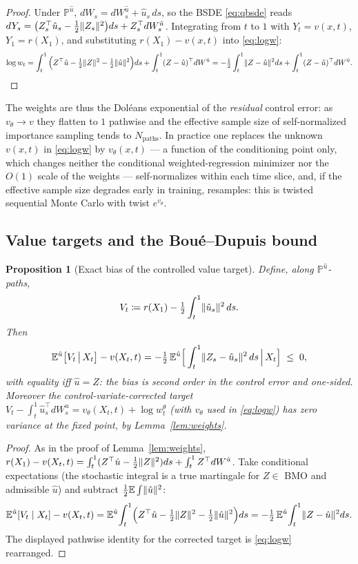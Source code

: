 \documentclass[11pt]{article}
\newtheorem{proposition}[theorem]{Proposition}
\theoremstyle{definition}
\theoremstyle{remark}
\newcommand{\E}{\mathbb{E}}
\newcommand{\Pmeas}{\mathbb{P}}
\newcommand{\uhat}{\hat{u}}
\DeclarePairedDelimiter{\norm}{\lVert}{\rVert}
\begin{document}
\begin{proof}
Under $\Pmeas^{\uhat}$, $dW_s = dW^{\uhat}_s + \uhat_s\,ds$, so the BSDE \eqref{eq:qbsde}
reads $dY_s = \big(Z_s^\top \uhat_s - \tfrac12\norm{Z_s}^2\big)ds + Z_s^\top dW^{\uhat}_s$.
Integrating from $t$ to $1$ with $Y_t = v(x,t)$, $Y_1 = r(X_1)$, and substituting
$r(X_1) - v(x,t)$ into \eqref{eq:logw}:
\[
\log w_t = \int_t^1\Big(Z^\top\uhat - \tfrac12\norm{Z}^2 - \tfrac12\norm{\uhat}^2\Big)ds
+ \int_t^1 (Z-\uhat)^\top dW^{\uhat}
= -\tfrac12\int_t^1\norm{Z-\uhat}^2 ds + \int_t^1 (Z-\uhat)^\top dW^{\uhat}. \qedhere
\]
\end{proof}

The weights are thus the Dol\'eans exponential of the \emph{residual} control error: as
$v_\theta \to v$ they flatten to $1$ pathwise and the effective sample size of
self-normalized importance sampling tends to $N_{\text{paths}}$. In practice one replaces the
unknown $v(x,t)$ in \eqref{eq:logw} by $v_\theta(x,t)$ --- a function of the conditioning
point only, which changes neither the conditional weighted-regression minimizer nor the
$O(1)$ scale of the weights --- self-normalizes within each time slice, and, if the effective
sample size degrades early in training, resamples: this is twisted sequential Monte Carlo
with twist $e^{v_\theta}$.

\subsection{Value targets and the Bou\'e--Dupuis bound}

\begin{proposition}[Exact bias of the controlled value target]\label{prop:elbo}
Define, along $\Pmeas^{\uhat}$-paths,
\[
V_t \coloneqq r(X_1) - \tfrac12\int_t^1 \norm{\uhat_s}^2\,ds .
\]
Then
\begin{equation}\label{eq:bias}
\E^{\uhat}\big[V_t \,\big|\, X_t\big] - v(X_t,t)
= -\tfrac12\, \E^{\uhat}\Big[\int_t^1 \norm{Z_s - \uhat_s}^2\, ds \,\Big|\, X_t\Big]
\;\le\; 0,
\end{equation}
with equality iff $\uhat = Z$: the bias is second order in the control error and one-sided.
Moreover the control-variate-corrected target
$V_t - \int_t^1 \uhat_s^\top dW^{\uhat}_s = v_\theta(X_t,t) + \log w_t^{\theta}$ (with
$v_\theta$ used in \eqref{eq:logw}) has \emph{zero variance} at the fixed point, by
Lemma~\ref{lem:weights}.
\end{proposition}

\begin{proof}
As in the proof of Lemma~\ref{lem:weights},
$r(X_1) - v(X_t,t) = \int_t^1 (Z^\top\uhat - \tfrac12\norm{Z}^2)ds + \int_t^1 Z^\top
dW^{\uhat}$. Take conditional expectations (the stochastic integral is a true martingale for
$Z\in$ BMO and admissible $\uhat$) and subtract $\tfrac12\E\int\norm{\uhat}^2$:
\[
\E^{\uhat}[V_t\mid X_t] - v(X_t,t)
= \E^{\uhat}\!\int_t^1\!\Big(Z^\top\uhat - \tfrac12\norm{Z}^2
- \tfrac12\norm{\uhat}^2\Big)ds
= -\tfrac12\,\E^{\uhat}\!\int_t^1 \norm{Z-\uhat}^2 ds .
\]
The displayed pathwise identity for the corrected target is \eqref{eq:logw} rearranged.
\end{proof}
\end{document}
